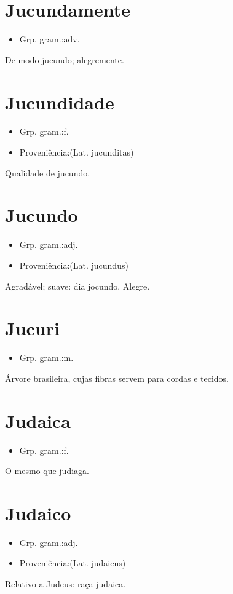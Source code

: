 \documentclass{article}
\begin{document}
\section{Jucundamente}
\begin{itemize}
\item {Grp. gram.:adv.}
\end{itemize}
De modo jucundo; alegremente.
\section{Jucundidade}
\begin{itemize}
\item {Grp. gram.:f.}
\end{itemize}
\begin{itemize}
\item {Proveniência:(Lat. \textunderscore jucunditas\textunderscore )}
\end{itemize}
Qualidade de jucundo.
\section{Jucundo}
\begin{itemize}
\item {Grp. gram.:adj.}
\end{itemize}
\begin{itemize}
\item {Proveniência:(Lat. \textunderscore jucundus\textunderscore )}
\end{itemize}
Agradável; suave: \textunderscore dia jocundo\textunderscore .
Alegre.
\section{Jucuri}
\begin{itemize}
\item {Grp. gram.:m.}
\end{itemize}
Árvore brasileira, cujas fibras servem para cordas e tecidos.
\section{Judaica}
\begin{itemize}
\item {Grp. gram.:f.}
\end{itemize}
O mesmo que \textunderscore judiaga\textunderscore .
\section{Judaico}
\begin{itemize}
\item {Grp. gram.:adj.}
\end{itemize}
\begin{itemize}
\item {Proveniência:(Lat. \textunderscore judaicus\textunderscore )}
\end{itemize}
Relativo a Judeus: \textunderscore raça judaica\textunderscore .
\end{document}
